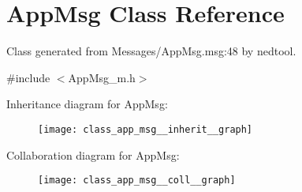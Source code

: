 \hypertarget{class_app_msg}{}\section{App\+Msg Class Reference}
\label{class_app_msg}


Class generated from {\ttfamily Messages/\+App\+Msg.\+msg\+:48} by nedtool.  




{\ttfamily \#include $<$App\+Msg\+\_\+m.\+h$>$}



Inheritance diagram for App\+Msg\+:
\nopagebreak
\begin{figure}[H]
\begin{center}
\leavevmode
\texttt{[image: class\_app\_msg\_\_inherit\_\_graph]}
\end{center}
\end{figure}


Collaboration diagram for App\+Msg\+:
\nopagebreak
\begin{figure}[H]
\begin{center}
\leavevmode
\texttt{[image: class\_app\_msg\_\_coll\_\_graph]}
\end{center}
\end{figure}
